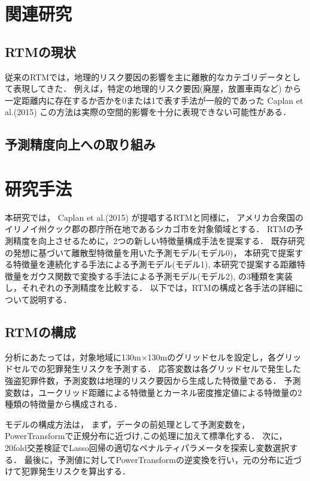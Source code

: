 \documentclass[12pt,a4paper,oneside]{jsbook}
\theoremstyle{plain}
\begin{document}
\chapter{関連研究}
\label{chapter_2}
\section{RTMの現状}
従来のRTMでは，地理的リスク要因の影響を主に離散的なカテゴリデータとして表現してきた．
例えば，特定の地理的リスク要因(廃屋，放置車両など)
から一定距離内に存在するか否かを0または1で表す手法が一般的であった
Caplan et al.(2015)\cite{caplan2015}
この方法は実際の空間的影響を十分に表現できない可能性がある．
\section{予測精度向上への取り組み}

\chapter{研究手法}
\label{chapter_3}
本研究では，
Caplan et al.(2015)\cite{caplan2015}
が提唱するRTMと同様に，
アメリカ合衆国のイリノイ州クック郡の郡庁所在地であるシカゴ市を対象領域とする．
RTMの予測精度を向上させるために，2つの新しい特徴量構成手法を提案する．
既存研究の発想に基づいて離散型特徴量を用いた予測モデル(モデル0)，
本研究で提案する特徴量を連続化する手法による予測モデル(モデル1),
本研究で提案する距離特徴量をガウス関数で変換する手法による予測モデル(モデル2),
の3種類を実装し，それぞれの予測精度を比較する．
以下では，RTMの構成と各手法の詳細について説明する．

\section{RTMの構成}
分析にあたっては，対象地域に130m×130mのグリッドセルを設定し，各グリッドセルでの犯罪発生リスクを予測する．
応答変数は各グリッドセルで発生した強盗犯罪件数，予測変数は地理的リスク要因から生成した特徴量である．
予測変数は，ユークリッド距離による特徴量とカーネル密度推定値による特徴量の2種類の特徴量から構成される．

モデルの構成方法は，
まず，データの前処理として予測変数を，PowerTransformで正規分布に近づけ,この処理に加えて標準化する．
次に，20fold交差検証でLasso回帰の適切なペナルティパラメータを探索し変数選択する．
最後に，予測値に対してPowerTransformの逆変換を行い，元の分布に近づけて犯罪発生リスクを算出する．
\end{document}
